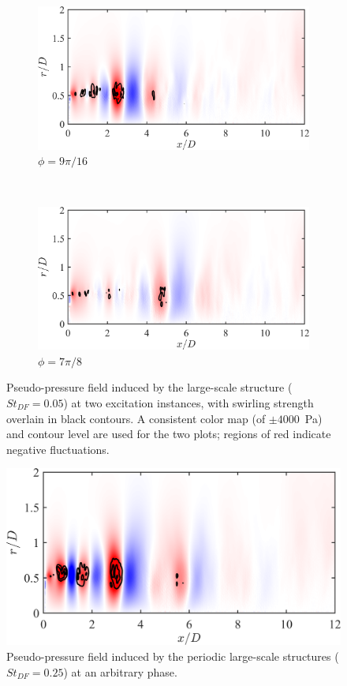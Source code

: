 \begin{figure}
	\centering
	\begin{subfigure}{0.75\textwidth}
		\centering
		\includegraphics[width=0.95\linewidth]{Figures/ch5_St005_PSL_101.png}
		\caption{$\phi = 9 \pi /16$}
	\end{subfigure}\\
	\begin{subfigure}{0.75\textwidth}
		\centering
		\includegraphics[width=0.95\linewidth]{Figures/ch5_St005_PSL_161.png}
		\caption{$\phi = 7 \pi /8$}
	\end{subfigure}
	\caption{Pseudo-pressure field induced by the large-scale structure ($St_{DF} = 0.05$) at two excitation instances, with swirling strength overlain in black contours. A consistent color map (of $\pm 4000$~Pa) and contour level are used for the two plots; regions of red indicate negative fluctuations.}
	\label{fig:PSL_St005}
\end{figure}
\begin{figure}
	\centering
	\includegraphics[width=0.70\linewidth]{Figures/ch5_St025_PSL_41.png}
	\caption{Pseudo-pressure field induced by the periodic large-scale structures ($St_{DF} = 0.25$) at an arbitrary phase.}
	\label{fig:PSL_St025}
\end{figure}

